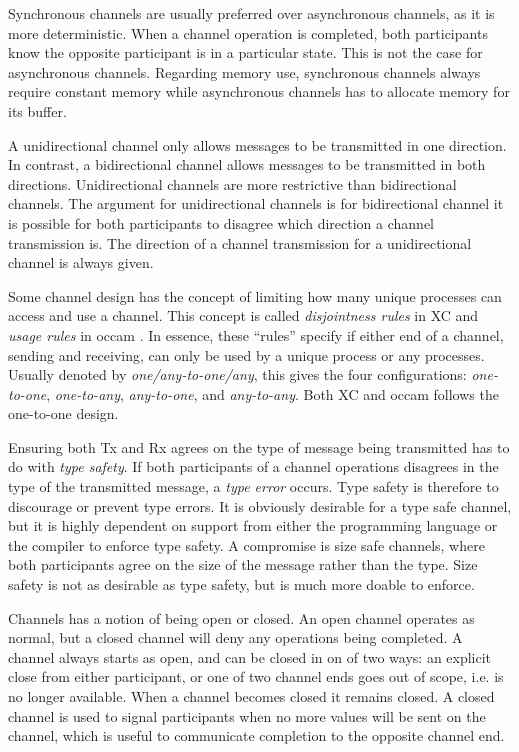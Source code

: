 Synchronous channels are usually preferred over asynchronous channels, as it is more deterministic. When a channel operation is completed, both participants know the opposite participant is in a particular state. This is not the case for asynchronous channels. Regarding memory use, synchronous channels always require constant memory while asynchronous channels has to allocate memory for its buffer.

A unidirectional channel only allows messages to be transmitted in one direction. In contrast, a bidirectional channel allows messages to be transmitted in both directions. Unidirectional channels are more restrictive than bidirectional channels. The argument for unidirectional channels is for bidirectional channel it is possible for both participants to disagree which direction a channel transmission is. The direction of a channel transmission for a unidirectional channel is always given.

Some channel design has the concept of limiting how many unique processes can access and use a channel. This concept is called \textit{disjointness rules} in XC \citep{douglas2009programming} and \textit{usage rules} in occam \citep{barrett1992occam}. In essence, these ``rules'' specify if either end of a channel, sending and receiving, can only be used by a unique process or any processes. Usually denoted by \textit{one/any\hyp{}to\hyp{}one/any}, this gives the four configurations: \textit{one\hyp{}to\hyp{}one}, \textit{one\hyp{}to\hyp{}any}, \textit{any\hyp{}to\hyp{}one}, and \textit{any\hyp{}to\hyp{}any}. Both XC and occam follows the one\hyp{}to\hyp{}one design.

Ensuring both Tx and Rx agrees on the type of message being transmitted has to do with \textit{type safety}. If both participants of a channel operations disagrees in the type of the transmitted message, a \textit{type error} occurs. Type safety is therefore to discourage or prevent type errors. It is obviously desirable for a type safe channel, but it is highly dependent on support from either the programming language or the compiler to enforce type safety. A compromise is size safe channels, where both participants agree on the size of the message rather than the type. Size safety is not as desirable as type safety, but is much more doable to enforce.

Channels has a notion of being open or closed. An open channel operates as normal, but a closed channel will deny any operations being completed. A channel always starts as open, and can be closed in on of two ways: an explicit close from either participant, or one of two channel ends goes out of scope, i.e. is no longer available. When a channel becomes closed it remains closed. A closed channel is used to signal participants when no more values will be sent on the channel, which is useful to communicate completion to the opposite channel end.

